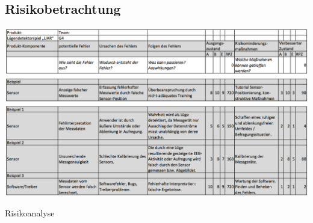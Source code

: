 	\begin{landscape}
   	\section{Risikobetrachtung}
   	\begin{table}[h!]
		\begin{center}
			\includegraphics[width=1.3\textwidth]{risikobetrachtung.png}
		\end{center}
		\caption[Risikoanalyse]{Risikoanalyse}
		\label{fig:risikoanalyse}
	\end{table}
	\end{landscape}
